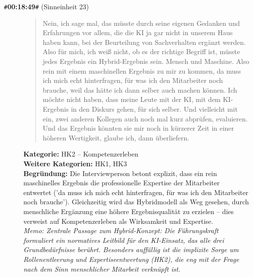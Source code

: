 \begin{description}
  \item[\texttt{\#}\textbf{00:18:49}\texttt{\#} (Sinneinheit 23)]
  \begin{quote}
  Nein, ich sage mal, das müsste durch seine eigenen Gedanken und Erfahrungen vor allem, die die KI ja gar nicht in unserem Haus haben kann, bei der Beurteilung von Sachverhalten ergänzt werden. Also für mich, ich weiß nicht, ob es der richtige Begriff ist, müsste jedes Ergebnis ein Hybrid-Ergebnis sein. Mensch und Maschine. Also rein mit einem maschinellen Ergebnis zu mir zu kommen, da muss ich mich echt hinterfragen, für was ich den Mitarbeiter noch brauche, weil das hätte ich dann selber auch machen können. Ich möchte nicht haben, dass meine Leute mit der KI, mit dem KI-Ergebnis in den Diskurs gehen, für sich selber. Und vielleicht mit ein, zwei anderen Kollegen auch noch mal kurz abprüfen, evaluieren. Und das Ergebnis könnten sie mir noch in kürzerer Zeit in einer höheren Wertigkeit, glaube ich, dann überliefern.
  \end{quote}
  \textbf{Kategorie:} HK2 -- Kompetenzerleben\\
  \textbf{Weitere Kategorien:} HK1, HK3\\
  \textbf{Begr\"undung:} Die Interviewperson betont explizit, dass ein rein maschinelles Ergebnis die professionelle Expertise der Mitarbeiter entwertet ('da muss ich mich echt hinterfragen, für was ich den Mitarbeiter noch brauche'). Gleichzeitig wird das Hybridmodell als Weg gesehen, durch menschliche Ergänzung eine höhere Ergebnisqualität zu erzielen – dies verweist auf Kompetenzerleben als Wirksamkeit und Expertise.
  \\\textit{Memo: Zentrale Passage zum Hybrid-Konzept: Die Führungskraft formuliert ein normatives Leitbild für den KI-Einsatz, das alle drei Grundbedürfnisse berührt. Besonders auffällig ist die implizite Sorge um Rollenentleerung und Expertiseentwertung (HK2), die eng mit der Frage nach dem Sinn menschlicher Mitarbeit verknüpft ist.}
\end{description}
\medskip

